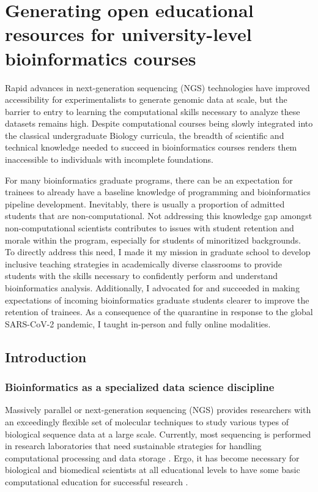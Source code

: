 \chapter{Generating open educational resources for university-level bioinformatics courses}

Rapid advances in next-generation sequencing (NGS) technologies have improved accessibility for experimentalists to generate genomic data at scale, but the barrier to entry to learning the computational skills necessary to analyze these datasets remains high. Despite computational courses being slowly integrated into the classical undergraduate Biology curricula, the breadth of scientific and technical knowledge needed to succeed in bioinformatics courses renders them inaccessible to individuals with incomplete foundations.

For many bioinformatics graduate programs, there can be an expectation for trainees to already have a baseline knowledge of programming and bioinformatics pipeline development. Inevitably, there is usually a proportion of admitted students that are non-computational. Not addressing this knowledge gap amongst non-computational scientists contributes to issues with student retention and morale within the program, especially for students of minoritized backgrounds. To directly address this need, I made it my mission in graduate school to develop inclusive teaching strategies in academically diverse classrooms to provide students with the skills necessary to confidently perform and understand bioinformatics analysis. Additionally, I advocated for and succeeded in making expectations of incoming bioinformatics graduate students clearer to improve the retention of trainees. As a consequence of the quarantine in response to the global SARS-CoV-2 pandemic, I taught in-person and fully online modalities. 

\section{Introduction}

\subsection{Bioinformatics as a specialized data science discipline}

Massively parallel or next-generation sequencing (NGS) provides researchers with an exceedingly flexible set of molecular techniques to study various types of biological sequence data at a large scale. Currently, most sequencing is performed in research laboratories that need sustainable strategies for handling computational processing and data storage \cite{barone2017,leonelli2019,marx2013,pal2020,stephens2015}. Ergo, it has become necessary for biological and biomedical scientists at all educational levels to have some basic computational education for successful research \cite{attwood2019,pevzner2009a,rubinstein2014,tan2009}. 

